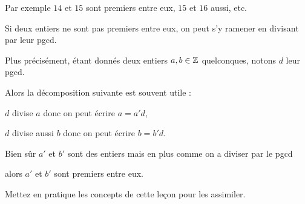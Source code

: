 Par exemple $14$ et $15$ sont premiers entre eux, $15$ et $16$ aussi, etc.

\change


Si deux entiers ne sont pas premiers entre eux, on peut s'y ramener en divisant par leur pgcd.

Plus précisément, étant donnés deux entiers $a,b \in \mathbb{Z}$ quelconques, notons $d$ leur pgcd.


Alors la décomposition suivante est souvent utile :

$d$ divise $a$ donc on peut écrire $a=a'd$,

$d$ divise aussi $b$ donc on peut écrire $b=b'd$.

Bien sûr $a'$ et $b'$ sont des entiers mais en plus comme on a diviser par le pgcd

alors $a'$ et $b'$ sont premiers entre eux.


\diapo

Mettez en pratique les concepts de cette leçon pour les assimiler.



